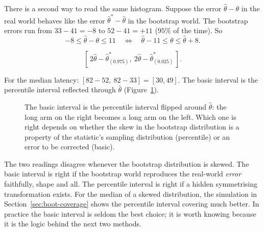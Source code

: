 There is a second way to read the same histogram. Suppose the error
$\hat\theta - \theta$ in the real world behaves like the error
$\hat\theta^* - \hat\theta$ in the bootstrap world. The bootstrap errors run
from $33 - 41 = -8$ to $52 - 41 = +11$ ($95\%$ of the time). So
\[
  -8 \le \hat\theta - \theta \le 11
  \quad\Longleftrightarrow\quad
  \hat\theta - 11 \le \theta \le \hat\theta + 8 .
\]

\begin{definition}
\[
  \left[\, 2\hat\theta - \hat\theta^*_{(0.975)},\ 2\hat\theta - \hat\theta^*_{(0.025)} \,\right].
\]
\end{definition}

For the median latency: $[82 - 52,\ 82 - 33] = [30, 49]$. The basic interval
is the percentile interval reflected through $\hat\theta$
(Figure~\ref{fig:bootstrap-pct-basic}).

\begin{figure}[H]
\centering
{}
\caption{The basic interval is the percentile interval flipped around
$\hat\theta$: the long arm on the right becomes a long arm on the left. Which
one is right depends on whether the skew in the bootstrap distribution is a
property of the statistic's sampling distribution (percentile) or an error to
be corrected (basic).}
\label{fig:bootstrap-pct-basic}
\end{figure}

The two readings disagree whenever the bootstrap distribution is skewed. The
basic interval is right if the bootstrap world reproduces the real-world
\emph{error} faithfully, shape and all. The percentile interval is right if a
hidden symmetrising transformation exists. For the median of a skewed
distribution, the simulation in Section~\ref{sec:boot-coverage} shows the
percentile interval covering much better. In practice the basic interval is
seldom the best choice; it is worth knowing because it is the logic behind the
next two methods.

